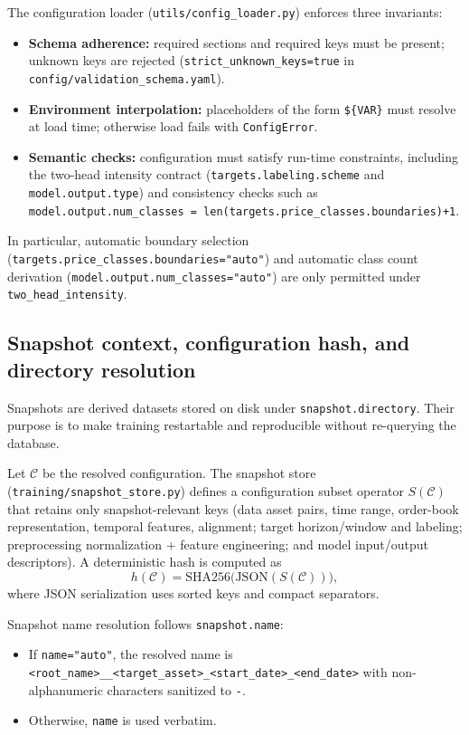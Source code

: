 \documentclass[11pt]{article}
\begin{document}
The configuration loader (\texttt{utils/config\_loader.py}) enforces three invariants:
\begin{itemize}
  \item \textbf{Schema adherence:} required sections and required keys must be present; unknown keys are rejected (\texttt{strict\_unknown\_keys=true} in \texttt{config/validation\_schema.yaml}).
  \item \textbf{Environment interpolation:} placeholders of the form \texttt{\$\{VAR\}} must resolve at load time; otherwise load fails with \texttt{ConfigError}.
  \item \textbf{Semantic checks:} configuration must satisfy run-time constraints, including the two-head intensity contract (\texttt{targets.labeling.scheme} and \texttt{model.output.type}) and consistency checks such as \texttt{model.output.num\_classes = len(targets.price\_classes.boundaries)+1}.
\end{itemize}

In particular, automatic boundary selection (\texttt{targets.price\_classes.boundaries="auto"}) and automatic class count derivation (\texttt{model.output.num\_classes="auto"}) are only permitted under \texttt{two\_head\_intensity}.

\subsection{Snapshot context, configuration hash, and directory resolution}

Snapshots are derived datasets stored on disk under \texttt{snapshot.directory}. Their purpose is to make training restartable and reproducible without re-querying the database.

Let $\mathcal{C}$ be the resolved configuration. The snapshot store (\texttt{training/snapshot\_store.py}) defines a configuration subset operator $S(\mathcal{C})$ that retains only snapshot-relevant keys (data asset pairs, time range, order-book representation, temporal features, alignment; target horizon/window and labeling; preprocessing normalization + feature engineering; and model input/output descriptors). A deterministic hash is computed as
\begin{equation}
  h(\mathcal{C}) = \mathrm{SHA256}\bigl(\mathrm{JSON}(S(\mathcal{C}))\bigr),
\end{equation}
where JSON serialization uses sorted keys and compact separators.

Snapshot name resolution follows \texttt{snapshot.name}:
\begin{itemize}
  \item If \texttt{name="auto"}, the resolved name is \texttt{<root\_name>\_<hash8>\_<target\_asset>\_<start\_date>\_<end\_date>} with non-alphanumeric characters sanitized to \texttt{-}.
  \item Otherwise, \texttt{name} is used verbatim.
\end{itemize}
\end{document}
